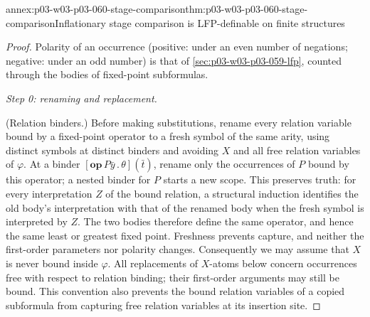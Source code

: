 \begin{annexitem}{annex:p03-w03-p03-060-stage-comparison}{thm:p03-w03-p03-060-stage-comparison}{Inflationary stage comparison is LFP-definable on finite structures}
\begin{proof}
Polarity of an occurrence (positive: under an even number of negations;
negative: under an odd number) is that of \cref{sec:p03-w03-p03-059-lfp},
counted through the bodies of fixed-point subformulas.

\emph{Step 0: renaming and replacement.}

(Relation binders.) Before making substitutions, rename every relation
variable bound by a fixed-point operator to a fresh symbol of the same
arity, using distinct symbols at distinct binders and avoiding \(X\) and
all free relation variables of \(\varphi\). At a binder
\([\mathbf{op}\,P\bar y\,.\,\theta](\bar t)\), rename only the occurrences
of \(P\) bound by this operator; a nested binder for \(P\) starts a new
scope. This preserves truth: for every interpretation \(Z\) of the bound
relation, a structural induction identifies the old body's interpretation
with that of the renamed body when the fresh symbol is interpreted by
\(Z\). The two bodies therefore define the same operator, and hence the
same least or greatest fixed point. Freshness prevents capture, and neither
the first-order parameters nor polarity changes. Consequently we may assume
that \(X\) is never bound inside \(\varphi\). All replacements of
\(X\)-atoms below concern occurrences free with respect to relation
binding; their first-order arguments may still be bound. This convention
also prevents the bound relation variables of a copied subformula from
capturing free relation variables at its insertion site.


\end{proof}
\end{annexitem}
